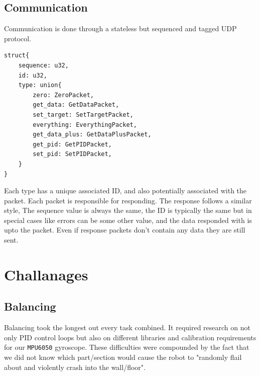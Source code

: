 \documentclass[12pt]{article}
\begin{document}
\subsection{Communication}
Communication is done through a stateless but sequenced and tagged UDP protocol. 



\begin{lstlisting}[language=RustLike]
struct{
	sequence: u32,
	id: u32,
	type: union{
		zero: ZeroPacket,
		get_data: GetDataPacket,
		set_target: SetTargetPacket,
		everything: EverythingPacket,
		get_data_plus: GetDataPlusPacket,
		get_pid: GetPIDPacket,
		set_pid: SetPIDPacket,
	}
}
\end{lstlisting}

Each type has a unique associated ID, and also potentially associated with the packet. Each packet is responsible for responding. The response follows a similar style, The sequence value is always the same, the ID is typically the same but in special cases like errors can be some other value, and the data responded with is upto the packet. Even if response packets don't contain any data they are still sent.

\section{Challanages}

\subsection{Balancing}
Balancing took the longest out every task combined. It required research on not only PID control loops but also on different libraries and calibration requirements for our \texttt{MPU6050} gyroscope. These difficulties were compounded by the fact that we did not know which part/section would cause the robot to "randomly flail about and violently crash into the wall/floor". 
\end{document}
